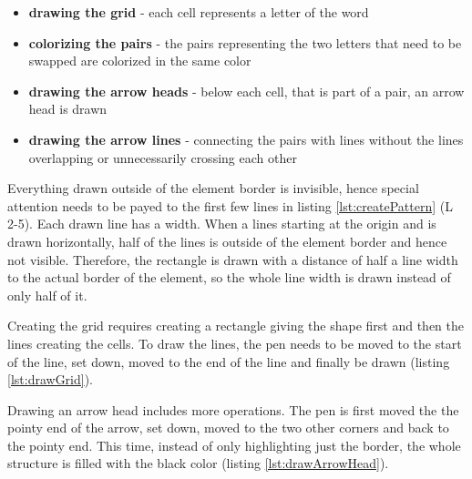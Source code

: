 \begin{itemize}
  \item \textbf{drawing the grid} - each cell represents a letter of the word
  \item \textbf{colorizing the pairs} - the pairs representing the two letters that need to be swapped are colorized in the same color
  \item \textbf{drawing the arrow heads} - below each cell, that is part of a pair, an arrow head is drawn
  \item \textbf{drawing the arrow lines} - connecting the pairs with lines without the lines overlapping or unnecessarily crossing each other
\end{itemize}

Everything drawn outside of the  element border is invisible, hence special attention needs to be payed to the first few lines in listing \ref{lst:createPattern} (L 2-5). Each drawn line has a width. When a lines starting at the origin and is drawn horizontally, half of the lines is outside of the  element border and hence not visible. Therefore, the rectangle is drawn with a distance of half a line width to the actual border of the  element, so the whole line width is drawn instead of only half of it. 

Creating the grid requires creating a rectangle giving the shape first and then the lines creating the cells. To draw the lines, the pen needs to be moved to the start of the line, set down, moved to the end of the line and finally be drawn (listing \ref{lst:drawGrid}). 

Drawing an arrow head includes more operations. The pen is first moved the the pointy end of the arrow, set down, moved to the two other corners and back to the pointy end. This time, instead of only highlighting just the border, the whole structure is filled with the black color (listing \ref{lst:drawArrowHead}).

